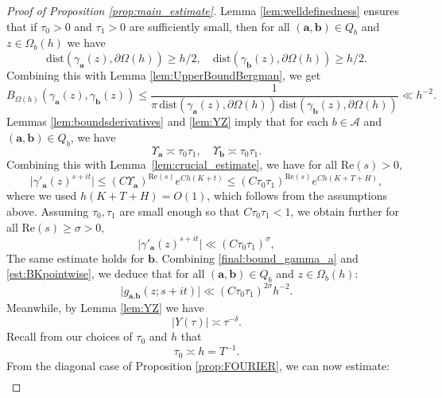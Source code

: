 \documentclass[12pt,letterpaper]{amsart}
\theoremstyle{plain}
\theoremstyle{definition}
\theoremstyle{remark}
\newcommand{\Aa}{\textbf{a}}
\newcommand{\Bb}{\textbf{b}}
\begin{document}
\begin{proof}[Proof of Proposition \ref{prop:main_estimate}]
Lemma \ref{lem:welldefinedness} ensures that if $\tau_0 > 0$ and $\tau_1 > 0$ are sufficiently small, then for all $(\Aa,\Bb)\in Q_b$ and $z\in \Omega_b(h)$ we have
$$
\mathrm{dist}( \gamma_{\Aa}(z), \partial \Omega(h) ) \ge h/2, \quad \mathrm{dist}( \gamma_{\Bb}(z), \partial \Omega(h) )\ge h/2.
$$
Combining this with Lemma \ref{lem:UpperBoundBergman}, we get
\begin{equation}\label{est:BKpointwise}
B_{\Omega(h)}(\gamma_{\Aa}(z), \gamma_{\Bb}(z) ) \le  \frac{1}{\pi\, \mathrm{dist}( \gamma_{\Aa}(z), \partial \Omega(h) )\, \mathrm{dist}( \gamma_{\Bb}(z), \partial \Omega(h) ) } \ll h^{-2}.
\end{equation}
Lemmas \ref{lem:boundsderivatives} and \ref{lem:YZ} imply that for each $b\in \mathcal{A}$ and $(\Aa,\Bb)\in Q_b$, we have 
$$
\Upsilon_{\Aa}  \asymp \tau_0 \tau_1, \quad \Upsilon_{\Bb}  \asymp \tau_0 \tau_1.
$$
Combining this with Lemma~\ref{lem:crucial_estimate}, we have for all $\mathrm{Re}(s) > 0,$
\begin{equation}
\vert \gamma'_{\Aa}(z)^{s+it} \vert \le  (C\Upsilon_{\Aa})^{\mathrm{Re}(s)} e^{C h (K+t)} \le ( C\tau_0 \tau_1 )^{\mathrm{Re}(s)} e^{C h (K+T+H)},
\end{equation}
where we used $h(K+T+H) = O(1) $, which follows from the assumptions above. Assuming $\tau_0, \tau_1$ are small enough so that $C\tau_0 \tau_1 < 1$, we obtain further for all $\mathrm{Re}(s) \ge \sigma > 0,$
\begin{equation}\label{final:bound_gamma_a}
\vert \gamma'_{\Aa}(z)^{s+it} \vert \ll ( C\tau_0 \tau_1 )^{\sigma},
\end{equation}
The same estimate holds for $\Bb$. Combining \eqref{final:bound_gamma_a} and \eqref{est:BKpointwise}, we deduce that for all $(\Aa,\Bb)\in Q_b$ and $z\in \Omega_b(h)$:
\begin{equation}\label{est:pointwisegab}
\vert g_{\Aa, \Bb}(z;s+it) \vert \ll  ( C\tau_0 \tau_1 )^{2\sigma} h^{-2}.
\end{equation}
Meanwhile, by Lemma \ref{lem:YZ} we have
\begin{equation}\label{final:bound_ytau}
\vert Y(\tau)\vert \asymp \tau^{-\delta}.
\end{equation}
Recall from our choices of $\tau_0$ and $h$ that
\begin{equation}\label{final:bound_tau0}
\tau_0 \asymp h = T^{-1}.
\end{equation}
From the diagonal case of Proposition \ref{prop:FOURIER}, we can now estimate:
\begin{align}

\end{align}
\end{proof}
\end{document}
